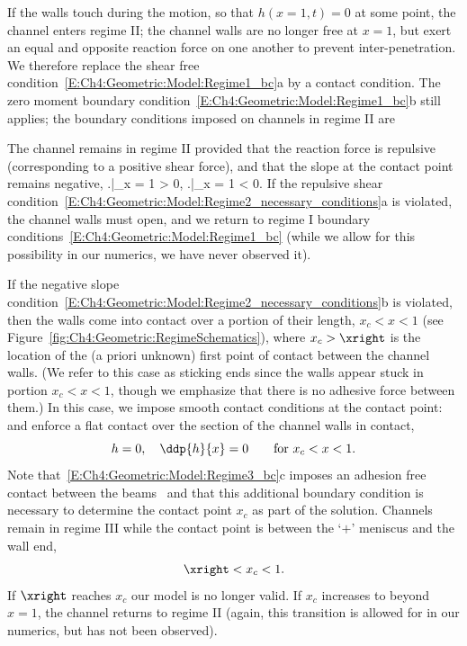 If the walls touch during the motion, so that $h(x =1,t) = 0$ at some point, the channel enters regime II; the channel walls are no longer free at $x = 1$, but exert an equal and opposite reaction force on one another to prevent inter-penetration. We therefore replace the shear free condition~\eqref{E:Ch4:Geometric:Model:Regime1_bc}a by a contact condition. The zero moment boundary condition~\eqref{E:Ch4:Geometric:Model:Regime1_bc}b still applies; the boundary conditions imposed on channels in regime II are

The channel remains in regime II provided that the reaction force is repulsive (corresponding to a positive shear force), and that the slope at the contact point remains negative,
{\left.\right|_{x = 1} > 0, \quad \left.\right|_{x = 1} < 0.}
If the repulsive shear condition~\eqref{E:Ch4:Geometric:Model:Regime2_necessary_conditions}a is violated, the channel walls must open, and we return to regime I boundary conditions~\eqref{E:Ch4:Geometric:Model:Regime1_bc} (while we allow for this possibility in our numerics, we have never observed it).

If the negative slope condition~\eqref{E:Ch4:Geometric:Model:Regime2_necessary_conditions}b is violated, then the walls come into contact over a portion of their length, $x_c < x <  1$ (see Figure~\ref{fig:Ch4:Geometric:RegimeSchematics}), where $x_c > \xright$ is the location of the (a priori unknown) first point of contact between the channel walls. (We refer to this case as sticking ends since the walls appear stuck in portion $x_c <x <1$, though we emphasize that there is no adhesive force between them.) In this case, we impose smooth contact conditions at the contact point:
and enforce a flat contact over the section of the channel walls in contact,
\begin{equation}
h = 0, \quad \ddp{h}{x} = 0 \qquad\text{for}~x_c < x < 1.
\end{equation}
Note that~\eqref{E:Ch4:Geometric:Model:Regime3_bc}c imposes an adhesion free contact between the beams~\citep{Kim2006JFM, Majidi2007MechRes} and that this additional boundary condition is necessary to determine the contact point $x_c$ as part of the solution. Channels remain in regime III while the contact point is between the `$+$' meniscus and the wall end,
\begin{equation}
\xright < x_c < 1.
\end{equation}
If $\xright$ reaches $x_c$  our model is no longer valid. If $x_c$ increases to beyond $x = 1$, the channel returns to regime II (again, this transition is allowed for in our numerics, but has not been observed).

